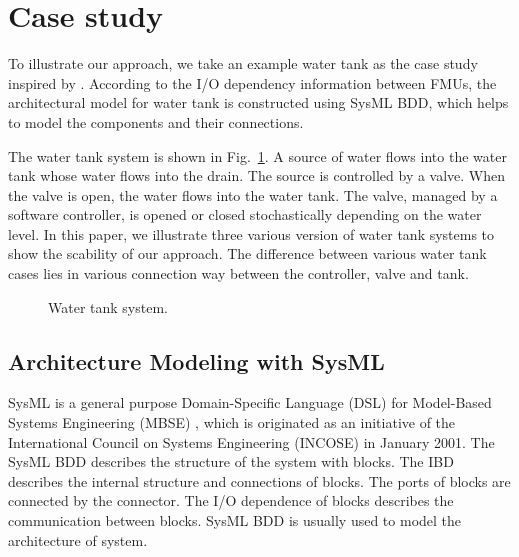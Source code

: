 
\section{Case study}
\label{sec:sysml}
To illustrate our approach, we take an example water tank as the case study inspired by \cite{AmalioPCW16}. According to the I/O dependency information between FMUs, the architectural model for water tank is constructed using SysML BDD, which helps to model the components and their connections.

The water tank system is shown in Fig.~\ref{tankfig}. A source of water flows into the water tank whose water flows into the drain. The source is controlled by a valve. When the valve is open, the water flows into the water tank. The valve, managed by a software controller, is opened or closed stochastically depending on the water level. In this paper, we illustrate three various version of water tank systems to show the scability of our approach. The difference between various water tank cases lies in various connection way between the controller, valve and tank. 
\begin{figure}[htbp]
	\caption{Water tank system.}
	\label{tankfig}
\end{figure} 
\subsection{Architecture Modeling with SysML}
SysML is a general purpose Domain-Specific Language (DSL) \cite{SemerathBHSV17} for Model-Based Systems Engineering (MBSE) \cite{Dori16}, which is originated as an initiative of the International Council on Systems Engineering (INCOSE) \cite{Pepper2015International} in January 2001. The SysML BDD describes the structure of the system with blocks. The IBD describes the internal structure and connections of blocks. The ports of blocks are connected by the connector. The I/O dependence of blocks describes the communication between blocks. SysML BDD is usually used to model the architecture of system.

